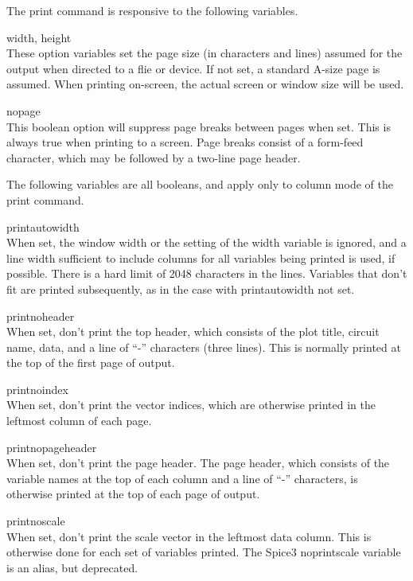 The print command is responsive to the following variables.

\begin{description}
\item{{\et width}, {\et height}}\\
These option variables set the page size (in characters and lines)
assumed for the output when directed to a flie or device.  If not set,
a standard A-size page is assumed.  When printing on-screen, the
actual screen or window size will be used.

\item{\et nopage}\\
This boolean option will suppress page breaks between pages when set. 
This is always true when printing to a screen.  Page breaks consist of
a form-feed character, which may be followed by a two-line page
header.
\end{description}

The following variables are all booleans, and apply only to column
mode of the {\cb print} command.

\begin{description}
\item{\et printautowidth}\\
When set, the window width or the setting of the {\et width} variable
is ignored, and a line width sufficient to include columns for all
variables being printed is used, if possible.  There is a hard limit
of 2048 characters in the lines.  Variables that don't fit are printed
subsequently, as in the case with {\et printautowidth} not set.

\item{\et printnoheader}\\
When set, don't print the top header, which consists of the plot
title, circuit name, data, and a line of ``{\vt -}'' characters (three
lines).  This is normally printed at the top of the first page of
output.

\item{\et printnoindex}\\
When set, don't print the vector indices, which are otherwise printed
in the leftmost column of each page.

\item{\et printnopageheader}\\
When set, don't print the page header.  The page header, which
consists of the variable names at the top of each column and a line of
``{\vt -}'' characters, is otherwise printed at the top of each page
of output.

\item{\et printnoscale}\\
When set, don't print the scale vector in the leftmost data column. 
This is otherwise done for each set of variables printed.  The Spice3
{\et noprintscale} variable is an alias, but deprecated.
\end{description}

